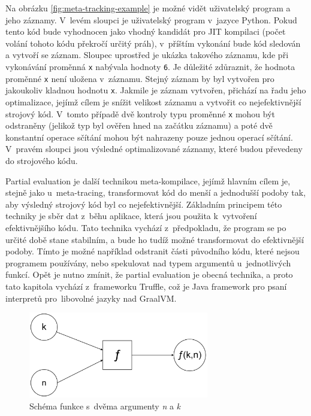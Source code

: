 \documentclass[
  master,
  biblatex,
  figures=true,
  theorems,
  sourcecodes,
  glossaries,
  index
]{kidiplom}
\begin{document}
Na obrázku \ref{fig:meta-tracking-example} je možné vidět uživatelský program a jeho záznamy. V~levém sloupci je uživatelský program v~jazyce Python. Pokud tento kód bude vyhodnocen jako vhodný kandidát pro JIT kompilaci (počet volání tohoto kódu překročí určitý práh), v~příštím vykonání bude kód sledován a vytvoří se záznam. Sloupec uprostřed je ukázka takového záznamu, kde při vykonávání proměnná \texttt{x} nabývala hodnoty \texttt{6}. Je důležité zdůraznit, že hodnota proměnné \texttt{x} není uložena v~záznamu. Stejný záznam by byl vytvořen pro jakoukoliv kladnou hodnotu \texttt{x}. Jakmile je záznam vytvořen, přichází na řadu jeho optimalizace, jejímž cílem je snížit velikost záznamu a vytvořit co nejefektivnější strojový kód. V~tomto případě dvě kontroly typu proměnné \texttt{x} mohou být odstraněny (jelikož typ byl ověřen hned na začátku záznamu) a poté dvě konstantní operace sčítání mohou být nahrazeny pouze jednou operací sčítání. V~pravém sloupci jsou výsledné optimalizované záznamy, které budou převedeny do strojového kódu. \cite{meta-tracing}


\label{partial-evaluation-chapter}
Partial evaluation je další technikou meta-kompilace, jejímž hlavním cílem je, stejně jako u~meta-tracing, transformovat kód do menší a jednodušší podoby tak, aby výsledný strojový kód byl co nejefektivnější. Základním principem této techniky je sběr dat z~běhu aplikace, která jsou použita k~vytvoření efektivnějšího kódu. Tato technika vychází z~předpokladu, že program se po určité době stane stabilním, a bude ho tudíž možné transformovat do efektivnější podoby. Tímto je možné například odstranit části původního kódu, které nejsou programem používány, nebo spekulovat nad typem argumentů u~jednotlivých funkcí. Opět je nutno zmínit, že partial evaluation je obecná technika, a proto tato kapitola vychází z~frameworku Truffle, což je Java framework pro psaní interpretů pro~libovolné jazyky nad GraalVM.



\begin{figure} [h]
    \centering
    \includegraphics[width= 0.7\textwidth]{images/pow-function.png}
    \caption{Schéma funkce s~dvěma argumenty \textit{n}  a \textit{k}}
    \label{fig:pow-fucntion}
\end{figure}
\end{document}
